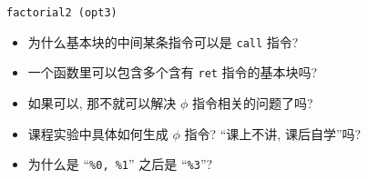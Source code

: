 \begin{frame}{}
	\vspace{-0.50cm}
\end{frame}

\begin{frame}{}
	\begin{center}

		\vspace{-0.30cm}
		\texttt{factorial2 (opt3)}
	\end{center}
\end{frame}

\begin{frame}{}
	\begin{center}
	\end{center}

	\pause
	\begin{itemize}[<+->]
		\setlength{\itemsep}{10pt}
		\item 为什么基本块的中间某条指令可以是 \texttt{call} 指令?
		\item 一个函数里可以包含多个含有 \texttt{ret} 指令的基本块吗?
		\item 如果可以, 那不就可以解决 $\phi$ 指令相关的问题了吗?
		\item 课程实验中具体如何生成 $\phi$ 指令? ``课上不讲, 课后自学''吗?
		\item 为什么是 ``\texttt{\%0, \%1}'' 之后是 ``\texttt{\%3}''?
	\end{itemize}
\end{frame}
